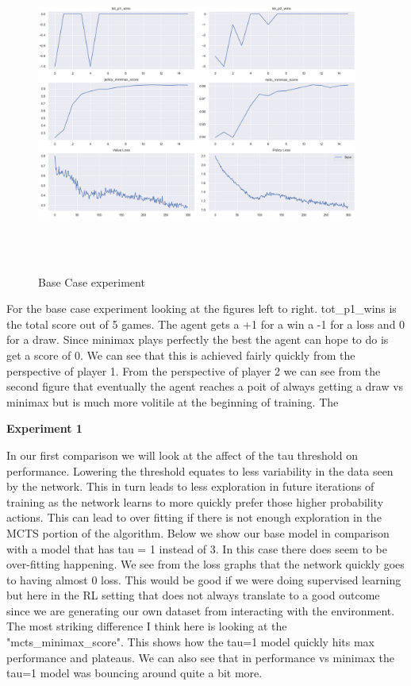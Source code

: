 \begin{figure}[H]
       \centering
       \includegraphics[width=400px,height=400px]{experiments/base_model.png}
       \caption{Base Case experiment}
       \label{fig:my_label}
\end{figure}

For the base case experiment looking at the figures left to right. tot\_p1\_wins is the total score out of 5 games. The agent gets a +1 for a win a -1 for a loss and 0 for a draw. Since minimax plays perfectly the best the agent can hope to do is get a score of 0. We can see that this is achieved fairly quickly from the perspective of player 1. From the perspective of player 2 we can see from the second figure that eventually the agent reaches a poit of always getting a draw vs minimax but is much more volitile at the beginning of training. The 




\textbf{Experiment 1}

In our first comparison we will look at the affect of the tau threshold on performance. Lowering the threshold equates to less variability in the data seen by the network. This in turn leads to less exploration in future iterations of training as the network learns to more quickly prefer those higher probability actions. This can lead to over fitting if there is not enough exploration in the MCTS portion of the algorithm. Below we show our base model in comparison with a model that has tau = 1 instead of 3. In this case there does seem to be over-fitting happening. We see from the loss graphs that the network quickly goes to having almost 0 loss. This would be good if we were doing supervised learning but here in the RL setting that does not always translate to a good outcome since we are generating our own dataset from interacting with the environment. The most striking difference I think here is looking at the "mcts\_minimax\_score". This shows how the tau=1 model quickly hits max performance and plateaus. We can also see that in performance vs minimax the tau=1 model was bouncing around quite a bit more. 

